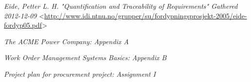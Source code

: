 \begin{thebibliography}{99}     
	

 \emph{Eide, Petter L. H. \textsl{"Quantiﬁcation and Traceability of Requirements"} Gathered 2012-12-09 } <\url{http://www.idi.ntnu.no/grupper/su/fordypningsprosjekt-2005/eide-fordyp05.pdf}>


 \emph{The ACME Power Company: Appendix A}

 \emph{Work Order Management Systems Basics: Appendix B}

 \emph{Project plan for procurement project: Assignment I}

\end{thebibliography}